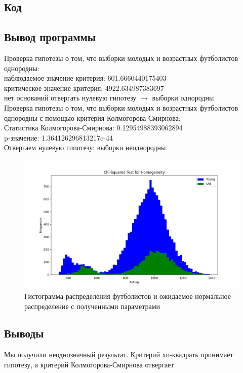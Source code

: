 \documentclass{article}
\begin{document}
\subsection{Код}
\subsection{Вывод программы}
Проверка гипотезы о том, что выборки молодых и возрастных футболистов однородны: \\
наблюдаемое значение критерия: 601.6660440175403 \\ 
критическое значение критерия: 4922.634987383697 \\ 
нет оснований отвергать нулевую гипотезу $ \rightarrow $ выборки однородны \\ 
Проверка гипотезы о том, что выборки молодых и возрастных футболистов однородны с помощью критерия Колмогорова-Смирнова: \\ 
Статистика Колмогорова-Смирнова: 0.12954988393062894 \\
p-значение: 1.364126296813217e-44 \\ 
Отвергаем нулевую гипотезу: выборки неоднородны.  \\
\begin{figure}[H]
      \centering
      \includegraphics[width=1\linewidth]{../python/task2.png}
      \caption{Гистограмма распределения футболистов и ожидаемое нормальное распределение с полученными параметрами}\label{fig:figure}
\end{figure}
\subsection{Выводы}
Мы получили неоднозначный результат. Критерий хи-квадрать принимает гипотезу, а критерий Колмогорова-Смирнова отвергает.
\end{document}
